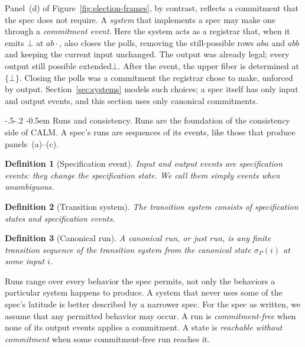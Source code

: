 \documentclass[sigconf]{cidr-2027}
\makeatletter
\newtheorem{definition}{Definition}
\theoremstyle{remark}
\renewcommand\paragraph{\@startsection{paragraph}{4}{\z@}%
  {-.5\baselineskip \@plus -2\p@ \@minus -.2\p@}%
  {-0.5em}%
  {\normalfont\bfseries}}
\newcommand{\commitment}{commitment\xspace}
\newcommand{\commitments}{commitments\xspace}
\newcommand{\outrelpast}{extended\xspace}     %
\makeatother
\begin{document}
\textcolor{reviewed}{Panel~(d) of Figure~\ref{fig:election-frames}, by contrast, reflects a
\commitment that the spec does not require.} \textcolor{reviewed}{A \emph{system} that implements a
spec may make one through a \emph{\commitment event}.} \textcolor{reviewed}{Here the system acts as
a registrar that, when it emits $\bot$ at $ab\cdot$, also closes the polls,
removing the still-possible rows $aba$ and $abb$ and keeping the current input
unchanged.} \textcolor{reviewed}{The output was already legal; every output still possible
\outrelpast $\bot$.} \textcolor{reviewed}{After the event, the upper fiber is determined at
$\{\bot\}$.} \textcolor{reviewed}{Closing the polls was a \commitment the registrar chose to make, unforced by output.} Section~\ref{sec:systems} models such choices; a spec itself has only input and
output events, and this section uses only canonical \commitments.

\paragraph{Runs and consistency.}
\textcolor{reviewed}{Runs are the foundation of the consistency side of CALM.} \textcolor{reviewed}{A spec's runs are
sequences of its events, like those that produce panels~(a)--(c).}

\begin{definition}[Specification event]
\label{def:specification-event}
Input and output events are \emph{specification events}: they change the
specification state. We call them simply \emph{events} when unambiguous.
\end{definition}

\begin{definition}[Transition system]
\label{def:transition-system}
The \emph{transition system} consists of specification states and
specification events.
\end{definition}

\begin{definition}[Canonical run]
\label{def:run}
A \emph{canonical run}, or just \emph{run}, is any finite transition sequence of the transition system from the
canonical state $\sigma_P(i)$ at some input $i$.
\end{definition}

Runs range over every behavior the spec permits, not only the behaviors a
particular system happens to produce. A system that never uses some of the
spec's latitude is better described by a narrower spec. For the spec as
written, we assume that any permitted behavior may occur. A run is
\emph{\commitment-free} when none of its output events applies a
\commitment. A state is \emph{reachable without \commitment} when some
\commitment-free run reaches it.
\end{document}
